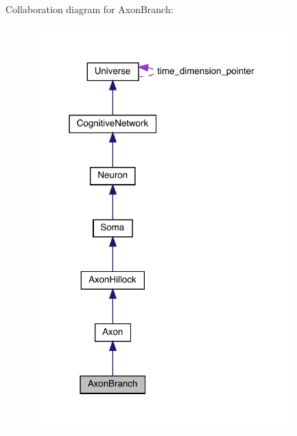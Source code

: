 Collaboration diagram for Axon\+Branch\+:\nopagebreak
\begin{figure}[H]
\begin{center}
\leavevmode
\includegraphics[width=283pt]{class_axon_branch__coll__graph}
\end{center}
\end{figure}
